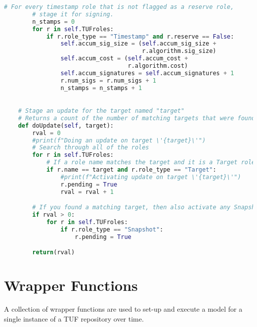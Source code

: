 \documentclass{article}
\begin{document}
\begin{lstlisting}[language=Python, basicstyle=\tiny]
        # For every timestamp role that is not flagged as a reserve role,
        # stage it for signing.
        n_stamps = 0
        for r in self.TUFroles:
            if r.role_type == "Timestamp" and r.reserve == False:
                self.accum_sig_size = (self.accum_sig_size +
                                       r.algorithm.sig_size)
                self.accum_cost = (self.accum_cost +
                                   r.algorithm.cost)
                self.accum_signatures = self.accum_signatures + 1
                r.num_sigs = r.num_sigs + 1
                n_stamps = n_stamps + 1

                
    # Stage an update for the target named "target"
    # Returns a count of the number of matching targets that were found
    def doUpdate(self, target):
        rval = 0
        #print(f"Doing an update on target \'{target}\'")
        # Search through all of the roles
        for r in self.TUFroles:
            # If a role name matches the target and it is a Target role
            if r.name == target and r.role_type == "Target":
                #print(f"Activating update on target \'{target}\'")
                r.pending = True
                rval = rval + 1

        # If you found a matching target, then also activate any Snapshots
        if rval > 0:
            for r in self.TUFroles:
                if r.role_type == "Snapshot":
                    r.pending = True

        return(rval)
\end{lstlisting}

\section{Wrapper Functions}
A collection of wrapper functions are used to set-up and execute a model for a single instance of a TUF repository over time.
\end{document}
